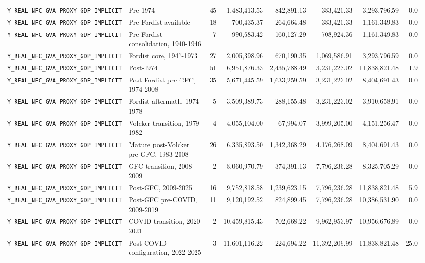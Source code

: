 \begin{landscape}
\begin{longtable}{p{4.4cm}p{3.8cm}rrrrrr}
\nolinkurl{Y_REAL_NFC_GVA_PROXY_GDP_IMPLICIT} & Pre-1974 & 45 & 1,483,413.53 & 842,891.13 & 383,420.33 & 3,293,796.59 & 0.0
\\
\nolinkurl{Y_REAL_NFC_GVA_PROXY_GDP_IMPLICIT} & Pre-Fordist available & 18 & 700,435.37 & 264,664.48 & 383,420.33 & 1,161,349.83 & 0.0
\\
\nolinkurl{Y_REAL_NFC_GVA_PROXY_GDP_IMPLICIT} & Pre-Fordist consolidation, 1940-1946 & 7 & 990,683.42 & 160,127.29 & 708,924.36 & 1,161,349.83 & 0.0
\\
\nolinkurl{Y_REAL_NFC_GVA_PROXY_GDP_IMPLICIT} & Fordist core, 1947-1973 & 27 & 2,005,398.96 & 670,190.35 & 1,069,586.91 & 3,293,796.59 & 0.0
\\
\nolinkurl{Y_REAL_NFC_GVA_PROXY_GDP_IMPLICIT} & Post-1974 & 51 & 6,951,876.33 & 2,435,788.49 & 3,231,223.02 & 11,838,821.48 & 1.9
\\
\nolinkurl{Y_REAL_NFC_GVA_PROXY_GDP_IMPLICIT} & Post-Fordist pre-GFC, 1974-2008 & 35 & 5,671,445.59 & 1,633,259.59 & 3,231,223.02 & 8,404,691.43 & 0.0
\\
\nolinkurl{Y_REAL_NFC_GVA_PROXY_GDP_IMPLICIT} & Fordist aftermath, 1974-1978 & 5 & 3,509,389.73 & 288,155.48 & 3,231,223.02 & 3,910,658.91 & 0.0
\\
\nolinkurl{Y_REAL_NFC_GVA_PROXY_GDP_IMPLICIT} & Volcker transition, 1979-1982 & 4 & 4,055,104.00 & 67,994.07 & 3,999,205.00 & 4,151,256.47 & 0.0
\\
\nolinkurl{Y_REAL_NFC_GVA_PROXY_GDP_IMPLICIT} & Mature post-Volcker pre-GFC, 1983-2008 & 26 & 6,335,893.50 & 1,342,368.29 & 4,176,268.09 & 8,404,691.43 & 0.0
\\
\nolinkurl{Y_REAL_NFC_GVA_PROXY_GDP_IMPLICIT} & GFC transition, 2008-2009 & 2 & 8,060,970.79 & 374,391.13 & 7,796,236.28 & 8,325,705.29 & 0.0
\\
\nolinkurl{Y_REAL_NFC_GVA_PROXY_GDP_IMPLICIT} & Post-GFC, 2009-2025 & 16 & 9,752,818.58 & 1,239,623.15 & 7,796,236.28 & 11,838,821.48 & 5.9
\\
\nolinkurl{Y_REAL_NFC_GVA_PROXY_GDP_IMPLICIT} & Post-GFC pre-COVID, 2009-2019 & 11 & 9,120,192.52 & 824,899.45 & 7,796,236.28 & 10,386,531.90 & 0.0
\\
\nolinkurl{Y_REAL_NFC_GVA_PROXY_GDP_IMPLICIT} & COVID transition, 2020-2021 & 2 & 10,459,815.43 & 702,668.22 & 9,962,953.97 & 10,956,676.89 & 0.0
\\
\nolinkurl{Y_REAL_NFC_GVA_PROXY_GDP_IMPLICIT} & Post-COVID configuration, 2022-2025 & 3 & 11,601,116.22 & 224,694.22 & 11,392,209.99 & 11,838,821.48 & 25.0
\\

\end{longtable}
\end{landscape}
